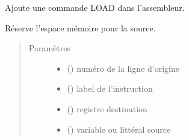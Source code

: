 \documentclass[letterpaper,10pt,french]{sphinxmanual}
\begin{document}
\begin{fulllineitems}
\begin{fulllineitems}
\begin{quote}
\begin{description}
\begin{itemize}
\end{itemize}

\end{description}\end{quote}

\end{fulllineitems}


\begin{fulllineitems}
\label{\detokenize{assembleurcontainer:assembleurcontainer.AssembleurContainer.pushLoad}}
Ajoute une commande LOAD dans l’assembleur.

Réserve l’espace mémoire pour la source.
\begin{quote}\begin{description}
\item[{Paramètres}] \leavevmode\begin{itemize}
\item {} 
 () \textendash{} numéro de la ligne d’origine

\item {} 
 (\sphinxstyleliteralemphasis{\sphinxupquote{{[}}}{\hyperref[\detokenize{label:label.Label}]{\sphinxcrossref{\sphinxstyleliteralemphasis{\sphinxupquote{Label}}}}}\sphinxstyleliteralemphasis{\sphinxupquote{{]}}}) \textendash{} label de l’instruction

\item {} 
 () \textendash{} registre destination

\item {} 
 () \textendash{} variable ou littéral source

\end{itemize}

\end{description}\end{quote}


\end{fulllineitems}
\end{fulllineitems}
\end{document}
